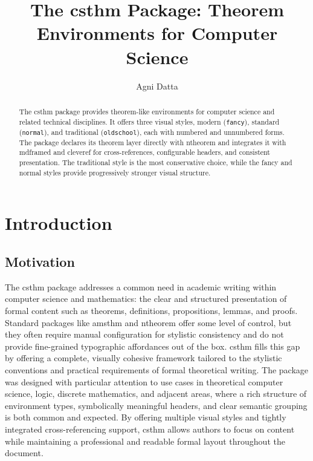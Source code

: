 \documentclass[10pt,letterpaper]{amsart}
\title{The \textsf{csthm} Package: Theorem Environments for Computer Science}
\author{Agni Datta}
\begin{document}
\begin{abstract}
	The \textsf{csthm} package provides theorem-like environments for computer science and related technical disciplines. It offers three visual styles, modern (\texttt{fancy}), standard (\texttt{normal}), and traditional (\texttt{oldschool}), each with numbered and unnumbered forms. The package declares its theorem layer directly with \textsf{ntheorem} and integrates it with \textsf{mdframed} and \textsf{cleveref} for cross-references, configurable headers, and consistent presentation. The traditional style is the most conservative choice, while the fancy and normal styles provide progressively stronger visual structure.
\end{abstract}

\maketitle

\clearpage
\tableofcontents
\vfill
\clearpage

\section{Introduction}

\subsection{Motivation}

The \textsf{csthm} package addresses a common need in academic writing within
computer science and mathematics: the clear and structured presentation of
formal content such as theorems, definitions, propositions, lemmas, and proofs.
Standard packages like \textsf{amsthm} and \textsf{ntheorem} offer some level
of control, but they often require manual configuration for stylistic
consistency and do not provide fine-grained typographic affordances out of the
box. \textsf{csthm} fills this gap by offering a complete, visually cohesive
framework tailored to the stylistic conventions and practical requirements of
formal theoretical writing. The package was designed with particular attention
to use cases in theoretical computer science, logic, discrete mathematics, and
adjacent areas, where a rich structure of environment types, symbolically
meaningful headers, and clear semantic grouping is both common and expected. By
offering multiple visual styles and tightly integrated cross-referencing
support, \textsf{csthm} allows authors to focus on content while maintaining a
professional and readable formal layout throughout the document.
\end{document}
